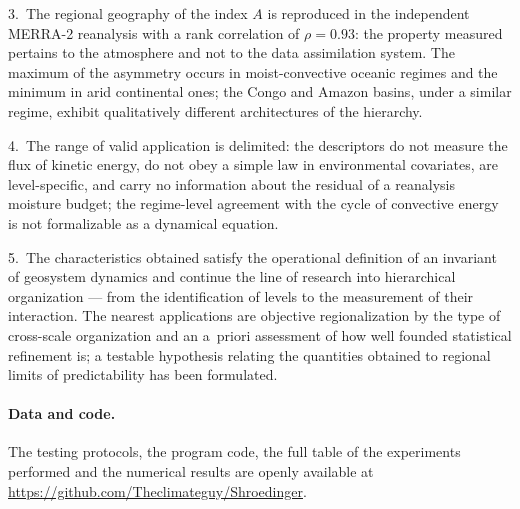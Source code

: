 \documentclass[11pt,a4paper]{article}
\begin{document}
3.~The regional geography of the index $A$ is reproduced in the independent MERRA-2 reanalysis with a rank correlation of $\rho=0.93$: the property measured pertains to the atmosphere and not to the data assimilation system. The maximum of the asymmetry occurs in moist-convective oceanic regimes and the minimum in arid continental ones; the Congo and Amazon basins, under a similar regime, exhibit qualitatively different architectures of the hierarchy.

4.~The range of valid application is delimited: the descriptors do not measure the flux of kinetic energy, do not obey a simple law in environmental covariates, are level-specific, and carry no information about the residual of a reanalysis moisture budget; the regime-level agreement with the cycle of convective energy is not formalizable as a dynamical equation.

5.~The characteristics obtained satisfy the operational definition of an invariant of geosystem dynamics and continue the line of research into hierarchical organization --- from the identification of levels to the measurement of their interaction. The nearest applications are objective regionalization by the type of cross-scale organization and an a~priori assessment of how well founded statistical refinement is; a testable hypothesis relating the quantities obtained to regional limits of predictability has been formulated.

\paragraph{Data and code.} The testing protocols, the program code, the full table of the experiments performed and the numerical results are openly available at \url{https://github.com/Theclimateguy/Shroedinger}.

\printbibliography[title={References}]
\end{document}
